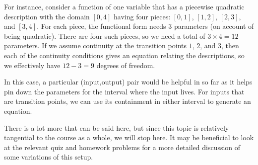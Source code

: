 \documentclass[10pt]{amsart}
\begin{document}
For instance, consider a function of one variable that has a piecewise
quadratic description with the domain $[0,4]$ having four pieces:
$[0,1]$, $[1,2]$, $[2,3]$, and $[3,4]$. For each piece, the functional
form needs $3$ parameters (on account of being quadratic). There are
four such pieces, so we need a total of $3 \times 4 = 12$
parameters. If we assume continuity at the transition points $1$, $2$,
and $3$, then each of the continuity conditions gives an equation
relating the descriptions, so we effectively have $12 - 3 = 9$ degrees
of freedom.

In this case, a particular (input,output) pair would be helpful in so
far as it helps pin down the parameters for the interval where the
input lives. For inputs that are transition points, we can use its
containment in either interval to generate an equation.

There is a lot more that can be said here, but since this topic is
relatively tangential to the course as a whole, we will stop here. It
may be beneficial to look at the relevant quiz and homework problems
for a more detailed discussion of some variations of this setup.
\end{document}
